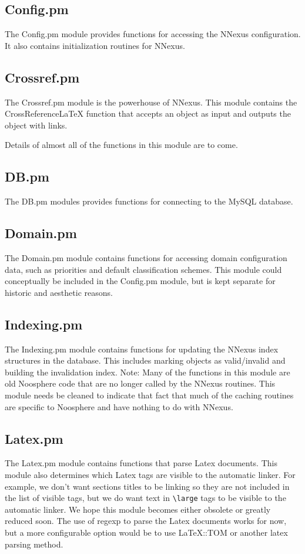 \documentclass{article}
\begin{document}
\subsection{Config.pm}
The Config.pm module provides functions for accessing the NNexus configuration. It also contains initialization routines for NNexus.

\subsection{Crossref.pm}
The Crossref.pm module is the powerhouse of NNexus. This module contains
the CrossReferenceLaTeX function that accepts an object as input and
outputs the object with links.

Details of almost all of the functions in this module are to come.

\subsection{DB.pm}
The DB.pm modules provides functions for connecting to the MySQL database.

\subsection{Domain.pm}
The Domain.pm module contains functions for accessing domain configuration data, such as priorities and default classification schemes. This module could
conceptually be included in the Config.pm module, but is kept separate for
historic and aesthetic reasons.

\subsection{Indexing.pm}
The Indexing.pm module contains functions for updating the NNexus index
structures in the database. This includes marking objects as valid/invalid
and building the invalidation index. Note: Many of the functions in this module
are old Noosphere code that are no longer called by the NNexus routines.
This module needs be cleaned to indicate that fact that much of the caching routines are specific to Noosphere and have nothing to do with NNexus.

\subsection{Latex.pm}
The Latex.pm module contains functions that parse Latex documents.
This module also determines which Latex tags are visible to the
automatic linker. For example, we don't want sections titles to be linking
so they are not included in the list of visible tags, but we do want
text in \verb#\large# tags to be visible to the automatic linker. We hope this
module becomes either obsolete or greatly reduced soon. The use of regexp
to parse the Latex documents works for now, but a more configurable option
would be to use LaTeX::TOM or another latex parsing method.
\end{document}

